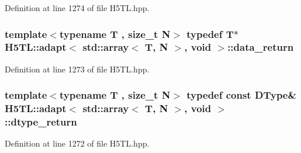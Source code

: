 Definition at line 1274 of file H5\-T\-L.\-hpp.

\hypertarget{struct_h5_t_l_1_1adapt_3_01std_1_1array_3_01_t_00_01_n_01_4_00_01void_01_4_accd8b93ace8a6bbdb0bdd3ae379aa4b3}{
\subsubsection[{data\-\_\-return}]{\setlength{\rightskip}{0pt plus 5cm}template$<$typename T , size\-\_\-t N$>$ typedef T$\ast$ {\bf H5\-T\-L\-::adapt}$<$ std\-::array$<$ T, N $>$, void $>$\-::{\bf data\-\_\-return}}}\label{struct_h5_t_l_1_1adapt_3_01std_1_1array_3_01_t_00_01_n_01_4_00_01void_01_4_accd8b93ace8a6bbdb0bdd3ae379aa4b3}


Definition at line 1273 of file H5\-T\-L.\-hpp.

\hypertarget{struct_h5_t_l_1_1adapt_3_01std_1_1array_3_01_t_00_01_n_01_4_00_01void_01_4_a1fb1cc7652f556911559cf0f5ceebb9e}{
\subsubsection[{dtype\-\_\-return}]{\setlength{\rightskip}{0pt plus 5cm}template$<$typename T , size\-\_\-t N$>$ typedef const {\bf D\-Type}\& {\bf H5\-T\-L\-::adapt}$<$ std\-::array$<$ T, N $>$, void $>$\-::{\bf dtype\-\_\-return}}}\label{struct_h5_t_l_1_1adapt_3_01std_1_1array_3_01_t_00_01_n_01_4_00_01void_01_4_a1fb1cc7652f556911559cf0f5ceebb9e}


Definition at line 1272 of file H5\-T\-L.\-hpp.




